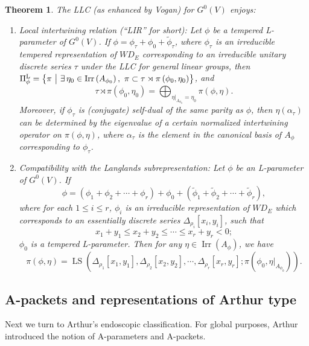 \documentclass[11pt,letterpaper]{amsart}
\theoremstyle{plain}
\newcounter{theorem}[section]
\numberwithin{theorem}{section}
\numberwithin{equation}{subsection}
\newtheorem{Thm}[theorem]{Theorem}
\theoremstyle{remark}
\newcommand{\Irr}{\operatorname{Irr}}
\newcommand{\LS}{\operatorname{LS}} %
\def\LP{\Pi^{\rm L}} %
\begin{document}
\begin{Thm}\label{T:LLCProperties}
The LLC (as enhanced by Vogan) for $G^0(V)$ enjoys:
\begin{enumerate}
    \item Local intertwining relation (``LIR'' for short): Let $\phi$ be a tempered L-parameter of $G^0(V)$. If $\phi = \phi_\tau + \phi_0 + \widetilde{\phi}_\tau$, where $\phi_\tau$ is an irreducible tempered representation of $WD_E$ corresponding to an irreducible unitary discrete series $\tau$ under the LLC for general linear groups, then $\LP_\phi = \left\{\pi~\big|~\exists\,\eta_0\in\Irr\left(A_{\phi_0}\right),~\pi\subset\tau\rtimes\pi\left(\phi_0,\eta_0\right)\right\}$, and
    \[
        \tau\rtimes\pi\left(\phi_0,\eta_0\right) = \bigoplus_{\eta|_{A_{\phi_0}}=\eta_0} \pi\left(\phi,\eta\right).
    \]
    Moreover, if $\phi_\tau$ is (conjugate) self-dual of the same parity as $\phi$, then $\eta(\alpha_\tau)$ can be determined by the eigenvalue of a certain normalized intertwining operator on $\pi\left(\phi,\eta\right)$, where $\alpha_\tau$ is the element in the canonical basis of $A_\phi$ corresponding to $\phi_\tau$.

    \vskip 5pt

    \item Compatibility with the Langlands subrepresentation: Let $\phi$ be an L-parameter of $G^0(V)$. If
    \[
        \phi = \left(\phi_1+\phi_2+\cdots+\phi_r\right) + \phi_0 + \left(\widetilde{\phi}_1+\widetilde{\phi}_2+\cdots+\widetilde{\phi}_r\right),
    \]
    where for each $1\leq i\leq r$, $\phi_i$ is an irreducible representation of $WD_E$ which corresponds to an essentially discrete series $\Delta_{\rho_i}[x_i,y_i]$, such that
    \[
        x_1+y_1\leq x_2+y_2\leq \cdots \leq x_r+y_r<0;
    \]
    $\phi_0$ is a tempered L-parameter. Then for any $\eta\in\Irr\left(A_\phi\right)$, we have
    \[
        \pi\left(\phi,\eta\right) = \LS\left(\Delta_{\rho_1}[x_1,y_1],\Delta_{\rho_2}[x_2,y_2],\cdots,\Delta_{\rho_r}[x_r,y_r];\pi\left(\phi_0,\eta\big|_{A_{\phi_0}}\right)\right).
    \]
\end{enumerate}    
\end{Thm}

\vskip 5pt

\subsection{A-packets and representations of Arthur type}

Next we turn to Arthur's endoscopic classification. For global purposes, Arthur introduced the notion of A-parameters and A-packets.
\end{document}
